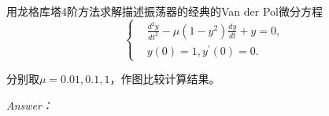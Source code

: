 \documentclass[12pt]{ctexart}
\begin{document}
	用龙格库塔4阶方法求解描述振荡器的经典的Van der Pol微分方程
	\begin{equation*}
	\left\{
	\begin{aligned}
	&\frac{d^2 y}{dt^2}-\mu(1-y^2)\frac{dy}{dt}+y=0, \\
	&y(0)=1,y^{'}(0)=0.
	\end{aligned}
	\right.
	\end{equation*}
	
	分别取$\mu=0.01,0.1,1$，作图比较计算结果。
	
	\textit{Answer：}
	
	\begin{figure}[htbp]
		\centering
		 \quad
\end{figure}
\end{document}
